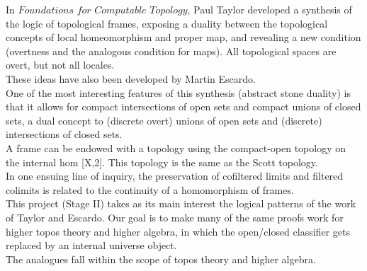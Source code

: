 \documentclass{book}
\begin{document}
In $\textit{Foundations for Computable Topology}$, Paul Taylor developed a synthesis of the logic of topological frames, exposing a duality between the topological concepts of local homeomorphism and proper map, and revealing a new condition (overtness and the analogous condition for maps). All topological spaces are overt, but not all locales.\\

These ideas have also been developed by Martin Escardo.\\

One of the most interesting features of this synthesis (abstract stone duality) is that it allows for compact intersections of open sets and compact unions of closed sets, a dual concept to (discrete overt) unions of open sets and (discrete) intersections of closed sets.\\

A frame can be endowed with a topology using the compact-open topology on the internal hom [X,2]. This topology is the same as the Scott topology.\\

In one ensuing line of inquiry, the preservation of cofiltered limits and filtered colimits is related to the continuity of a homomorphism of frames.\\

This project (Stage II) takes as its main interest the logical patterns of the work of Taylor and Escardo. Our goal is to make many of the same proofs work for higher topos theory and higher algebra, in which the open/closed classifier gets replaced by an internal universe object.\\ 

The analogues fall within the scope of topos theory and higher algebra.\\
\end{document}
